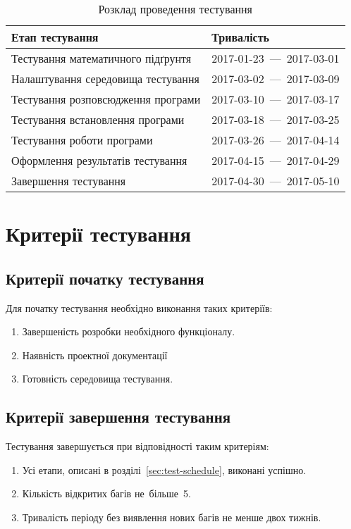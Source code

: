 \documentclass[a4paper,oneside,DIV=12,12pt]{scrartcl}
\begin{document}
		\begin{table}[!htbp]
		\centering
			\begin{tabular}{v{0.4\textwidth}n{0.5\textwidth}}
				\toprule
					Етап тестування & Тривалість\\
				\midrule
					Тестування математичного підґрунтя &
					2017-01-23~—~2017-03-01\\
					Налаштування середовища тестування &
					2017-03-02~—~2017-03-09\\
					Тестування розповсюдження програми &
					2017-03-10~—~2017-03-17\\
					Тестування встановлення програми &
					2017-03-18~—~2017-03-25\\
					Тестування роботи програми &
					2017-03-26~—~2017-04-14\\
					Оформлення результатів тестування &
					2017-04-15~—~2017-04-29\\
					Завершення тестування &
					2017-04-30~—~2017-05-10\\
				\bottomrule
			\end{tabular}
		\caption{Розклад проведення тестування}
		\label{tab:test-schedule}
		\end{table}
		
    \section{Критерії тестування}
		\label{sec:test-criteria}
		
		\subsection{Критерії початку тестування}
			Для початку тестування необхідно виконання таких критеріїв:
			\begin{enumerate}
				\item Завершеність розробки необхідного функціоналу.
				\item Наявність проектної документації
				\item Готовність середовища тестування.
			\end{enumerate}
			
		\subsection{Критерії завершення тестування}
			Тестування завершується при відповідності таким критеріям:
			\begin{enumerate}
				\item Усі етапи, описані в розділі~\ref{sec:test-schedule}, виконані успішно.
				\item Кількість відкритих багів не~більше~5.
				\item Тривалість періоду без виявлення нових багів не менше двох тижнів.
			\end{enumerate}
			
\end{document}
